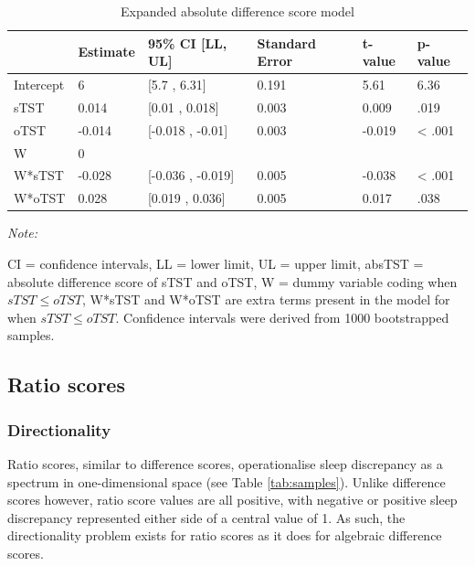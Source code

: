 \documentclass[
]{article}
\begin{document}
\begin{table}[!h]
\centering
\caption{\label{tab:absoluteexpanded}Expanded absolute difference score model}
\centering
\fontsize{10}{12}\selectfont
\begin{threeparttable}
\begin{tabular}[t]{llllll}
\toprule
  & Estimate & 95\% CI [LL, UL] & Standard Error & t-value & p-value\\
\midrule
Intercept & 6 & {}[5.7 , 6.31] & 0.191 & 5.61 & 6.36\\
sTST & 0.014 & {}[0.01 , 0.018] & 0.003 & 0.009 & .019\\
oTST & -0.014 & {}[-0.018 , -0.01] & 0.003 & -0.019 & < .001\\
W & 0 &  &  &  & \\
W*sTST & -0.028 & {}[-0.036 , -0.019] & 0.005 & -0.038 & < .001\\
\addlinespace
W*oTST & 0.028 & {}[0.019 , 0.036] & 0.005 & 0.017 & .038\\
\bottomrule
\end{tabular}
\begin{tablenotes}[para]
\item \textit{Note: } 
\item CI = confidence intervals, LL = lower limit, UL = upper limit, absTST = absolute difference score of sTST and oTST, W = dummy variable coding when $sTST \le oTST$, W*sTST and W*oTST are extra terms present in the model for when $sTST \le oTST$. Confidence intervals were derived from 1000 bootstrapped samples.
\end{tablenotes}
\end{threeparttable}
\end{table}

\subsection{Ratio scores}\label{ratio-scores}

\subsubsection{Directionality}\label{directionality-2}

Ratio scores, similar to difference scores, operationalise sleep discrepancy as a spectrum in one-dimensional space (see Table \ref{tab:samples}). Unlike difference scores however, ratio score values are all positive, with negative or positive sleep discrepancy represented either side of a central value of 1. As such, the directionality problem exists for ratio scores as it does for algebraic difference scores.
\end{document}
